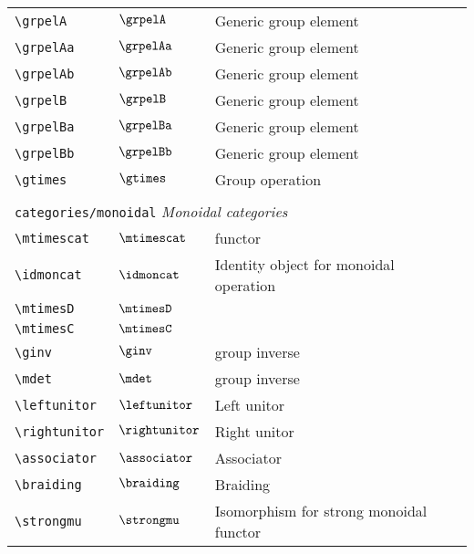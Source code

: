 \begin{longtable}{lll}
 {\color[rgb]{0.5,0.5,0.5}\texttt{\textbackslash grpelA}} & $\grpelA$ &  Generic group element\\ 
 {\color[rgb]{0.5,0.5,0.5}\texttt{\textbackslash grpelAa}} & $\grpelAa$ &  Generic group element\\ 
 {\color[rgb]{0.5,0.5,0.5}\texttt{\textbackslash grpelAb}} & $\grpelAb$ &  Generic group element\\ 
 {\color[rgb]{0.5,0.5,0.5}\texttt{\textbackslash grpelB}} & $\grpelB$ &  Generic group element\\ 
 {\color[rgb]{0.5,0.5,0.5}\texttt{\textbackslash grpelBa}} & $\grpelBa$ &  Generic group element\\ 
 {\color[rgb]{0.5,0.5,0.5}\texttt{\textbackslash grpelBb}} & $\grpelBb$ &  Generic group element\\ 
 {\color[rgb]{0.5,0.5,0.5}\texttt{\textbackslash gtimes}} & $\gtimes$ &  Group operation\\ 
  &  & \\ 
 \multicolumn{3}{l}{{\color[rgb]{0.5,0.5,0.5}\texttt{categories/monoidal}} \emph{Monoidal categories}}\\ 
 \hline
{\color[rgb]{0.5,0.5,0.5}\texttt{\textbackslash mtimescat}} & $\mtimescat$ &  functor\\ 
 {\color[rgb]{0.5,0.5,0.5}\texttt{\textbackslash idmoncat}} & $\idmoncat$ &  Identity object for monoidal operation\\ 
 {\color[rgb]{0.5,0.5,0.5}\texttt{\textbackslash mtimesD}} & $\mtimesD$ & \\ 
 {\color[rgb]{0.5,0.5,0.5}\texttt{\textbackslash mtimesC}} & $\mtimesC$ & \\ 
 {\color[rgb]{0.5,0.5,0.5}\texttt{\textbackslash ginv}} & $\ginv$ &  group inverse\\ 
 {\color[rgb]{0.5,0.5,0.5}\texttt{\textbackslash mdet}} & $\mdet$ &  group inverse\\ 
 {\color[rgb]{0.5,0.5,0.5}\texttt{\textbackslash leftunitor}} & $\leftunitor$ &  Left unitor\\ 
 {\color[rgb]{0.5,0.5,0.5}\texttt{\textbackslash rightunitor}} & $\rightunitor$ &  Right unitor\\ 
 {\color[rgb]{0.5,0.5,0.5}\texttt{\textbackslash associator}} & $\associator$ &  Associator\\ 
 {\color[rgb]{0.5,0.5,0.5}\texttt{\textbackslash braiding}} & $\braiding$ &  Braiding\\ 
 {\color[rgb]{0.5,0.5,0.5}\texttt{\textbackslash strongmu}} & $\strongmu$ &  Isomorphism for strong monoidal functor\\ 

\end{longtable}
